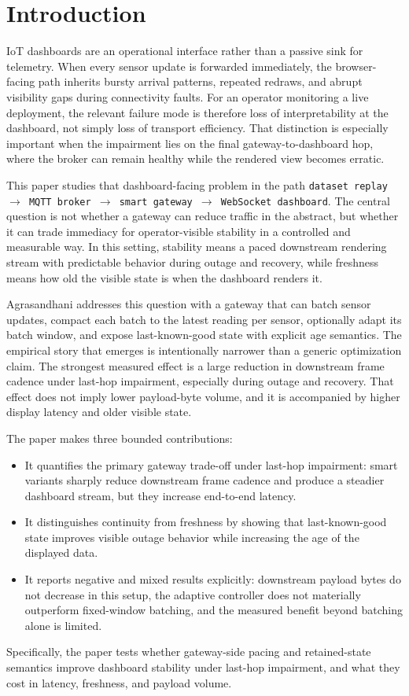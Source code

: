 \section{Introduction}

IoT dashboards are an operational interface rather than a passive sink for telemetry. When every sensor update is forwarded immediately, the browser-facing path inherits bursty arrival patterns, repeated redraws, and abrupt visibility gaps during connectivity faults. For an operator monitoring a live deployment, the relevant failure mode is therefore loss of interpretability at the dashboard, not simply loss of transport efficiency. That distinction is especially important when the impairment lies on the final gateway-to-dashboard hop, where the broker can remain healthy while the rendered view becomes erratic.

This paper studies that dashboard-facing problem in the path \texttt{dataset replay $\rightarrow$ MQTT broker $\rightarrow$ smart gateway $\rightarrow$ WebSocket dashboard}. The central question is not whether a gateway can reduce traffic in the abstract, but whether it can trade immediacy for operator-visible stability in a controlled and measurable way. In this setting, stability means a paced downstream rendering stream with predictable behavior during outage and recovery, while freshness means how old the visible state is when the dashboard renders it.

Agrasandhani addresses this question with a gateway that can batch sensor updates, compact each batch to the latest reading per sensor, optionally adapt its batch window, and expose last-known-good state with explicit age semantics. The empirical story that emerges is intentionally narrower than a generic optimization claim. The strongest measured effect is a large reduction in downstream frame cadence under last-hop impairment, especially during outage and recovery. That effect does not imply lower payload-byte volume, and it is accompanied by higher display latency and older visible state.

The paper makes three bounded contributions:
\begin{itemize}[leftmargin=*]
  \item It quantifies the primary gateway trade-off under last-hop impairment: smart variants sharply reduce downstream frame cadence and produce a steadier dashboard stream, but they increase end-to-end latency.
  \item It distinguishes continuity from freshness by showing that last-known-good state improves visible outage behavior while increasing the age of the displayed data.
  \item It reports negative and mixed results explicitly: downstream payload bytes do not decrease in this setup, the adaptive controller does not materially outperform fixed-window batching, and the measured benefit beyond batching alone is limited.
\end{itemize}

Specifically, the paper tests whether gateway-side pacing and retained-state semantics improve dashboard stability under last-hop impairment, and what they cost in latency, freshness, and payload volume.
